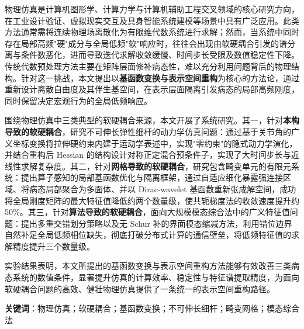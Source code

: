 \cleardoublepage
{}

物理仿真是计算机图形学、计算力学与计算机辅助工程交叉领域的核心研究方向，在工业设计验证、虚拟现实交互及具身智能系统建模等场景中具有广泛应用。此类方法通常需将连续物理场离散化为有限维代数系统进行求解；然而，当系统中同时存在局部高频"硬"成分与全局低频"软"响应时，往往会出现由软硬耦合引发的谱分离与条件数恶化，进而导致迭代求解收敛缓慢、时间步长受限及数值稳定性下降。传统代数预处理方法主要在矩阵层面修补病态性，难以充分利用问题背后的物理结构。针对这一挑战，本文提出以\textbf{基函数变换与表示空间重构}为核心的方法论，通过重新设计离散自由度及其伴生基空间，在表示层面隔离引发病态的局部高频刚度，同时保留决定宏观行为的全局低频响应。

围绕物理仿真中三类典型的软硬耦合来源，本文开展了系统研究。其一，针对\textbf{本构导致的软硬耦合}，研究不可伸长弹性细杆的动力学仿真问题：通过基于关节角的广义坐标变换将拉伸硬约束内建于运动学表述中，实现"零约束"的隐式动力学演化，并结合重构后 Hessian 的结构设计对称正定混合预条件子，实现了大时间步长与近线性求解复杂度。其二，针对\textbf{网格导致的软硬耦合}，研究包含畸变单元的有限元系统：提出算子感知的局部基函数优化与隔离框架，通过自适应细化暴露强连接区域、将病态局部聚合为多面体、并以 Dirac-wavelet 基函数重新张成解空间，成功将全局刚度矩阵的最大特征值降低约两个数量级，使共轭梯度法的收敛速度提升约50\%。其三，针对\textbf{算法导致的软硬耦合}，面向大规模模态综合法中的广义特征值问题：提出多重交错划分策略以及无 Schur 补的界面模态缩减方法，利用错位边界自然补足全局低频相位缺失，彻底打破分布式计算的通信壁垒，将低频特征值的求解精度提升三个数量级。

实验结果表明，本文所提出的基函数变换与表示空间重构方法能够有效改善三类病态系统的数值条件，显著提升仿真的计算效率、稳定性与特征谱提取精度，为面向软硬耦合问题的高效、健壮物理仿真提供了一条统一的表示空间重构路径。

\bigskip
\noindent \textbf{关键词}：物理仿真；软硬耦合；基函数变换；不可伸长细杆；畸变网格；模态综合法

\cleardoublepage
{}

